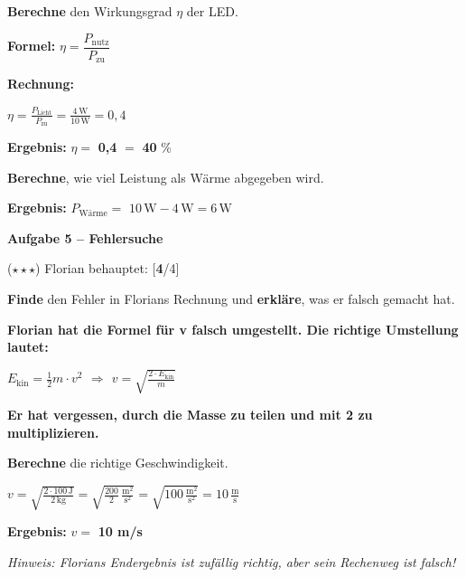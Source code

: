 \documentclass[11pt, a4paper]{article}
\newcommand{\lsg}[1]{\textcolor{loesung}{\textbf{#1}}}
\newcommand{\punktebox}[1]{\hfill\small\textcolor{mittelgrau}{[\lsg{#1}/#1]}}
\newcommand{\aufgabe}[1]{%
    \needspace{4\baselineskip}%
    \vspace{10pt}%
    \noindent\textbf{\textcolor{fachfarbe}{Aufgabe #1}}%
    \vspace{4pt}%
    \nopagebreak[4]%
}
\newcommand{\operator}[1]{\textbf{\textcolor{fachfarbe}{#1}}}
\begin{document}
\begin{teil}
\item \operator{Berechne} den Wirkungsgrad $\eta$ der LED.

\vspace{4pt}
\textbf{Formel:} $\eta = \dfrac{P_\text{nutz}}{P_\text{zu}}$

\vspace{6pt}
\textbf{Rechnung:}

\lsg{$\eta = \frac{P_\text{Licht}}{P_\text{zu}} = \frac{4\,\text{W}}{10\,\text{W}} = 0{,}4$}

\textbf{Ergebnis:} $\eta = $ \lsg{0,4} $= $ \lsg{40} \%

\vspace{4pt}

\item \operator{Berechne}, wie viel Leistung als Wärme abgegeben wird.

\vspace{6pt}
\textbf{Ergebnis:} $P_\text{Wärme} = $ \lsg{$10\,\text{W} - 4\,\text{W} = 6\,\text{W}$}
\end{teil}

\vspace{0.5em}

\aufgabe{5 – Fehlersuche}

($\star\star\star$) Florian behauptet: \punktebox{4}

\begin{center}
\end{center}

\begin{teil}
\item \operator{Finde} den Fehler in Florians Rechnung und \operator{erkläre}, was er falsch gemacht hat.

\lsg{Florian hat die Formel für v falsch umgestellt. Die richtige Umstellung lautet:}

\lsg{$E_\text{kin} = \frac{1}{2} m \cdot v^2$ \quad $\Rightarrow$ \quad $v = \sqrt{\frac{2 \cdot E_\text{kin}}{m}}$}

\lsg{Er hat vergessen, durch die Masse zu teilen und mit 2 zu multiplizieren.}

\item \operator{Berechne} die richtige Geschwindigkeit.

\lsg{$v = \sqrt{\frac{2 \cdot 100\,\text{J}}{2\,\text{kg}}} = \sqrt{\frac{200}{2}\,\frac{\text{m}^2}{\text{s}^2}} = \sqrt{100\,\frac{\text{m}^2}{\text{s}^2}} = 10\,\frac{\text{m}}{\text{s}}$}

\textbf{Ergebnis:} $v = $ \lsg{10 m/s}

\textit{Hinweis: Florians Endergebnis ist zufällig richtig, aber sein Rechenweg ist falsch!}
\end{teil}
\end{document}
